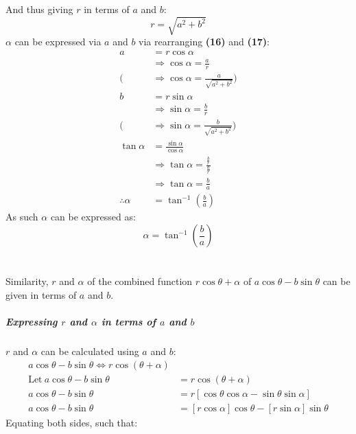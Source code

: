 \documentclass{article}
\begin{document}
        And thus giving $r$ in terms of $a$ and $b$:
        \begin{equation}
            r = \sqrt{a^2 + b^2}
        \end{equation}
        $\alpha$ can be expressed via $a$ and $b$ via rearranging \textbf{(16)} and \textbf{(17)}:
        \begin{align*}
            a &= r\cos\alpha \\
            &\Rightarrow \cos\alpha = \frac{a}{r} \\
            (&\Rightarrow \cos\alpha = \frac{a}{\sqrt{a^2 + b^2}}) \\
            b &= r\sin\alpha \\
            &\Rightarrow \sin\alpha = \frac{b}{r} \\
            (&\Rightarrow \sin\alpha = \frac{b}{\sqrt{a^2 + b^2}}) \\
            \tan\alpha &= \frac{\sin\alpha}{\cos\alpha} \\
            &\Rightarrow \tan\alpha = \frac{\frac{b}{r}}{\frac{a}{r}} \\
            &\Rightarrow \tan\alpha = \frac{b}{a} \\
            \therefore \alpha &= \tan^{-1}{\left( \frac{b}{a}\right) }
        \end{align*}
        As such $\alpha$ can be expressed as:
        \begin{equation}
            \alpha = \tan^{-1}{\left( \frac{b}{a}\right) }
        \end{equation} \\\\
        Similarity, $r$ and $\alpha$ of the combined function $r\cos{\theta + \alpha}$ of $a\cos{\theta} - b\sin{\theta}$ can be given in terms of $a$ and $b$.
        \subparagraph{Expressing $r$ and $\alpha$ in terms of $a$ and $b$} $r$ and $\alpha$ can be calculated using $a$ and $b$:
        \begin{align*}
        a\cos{\theta} - b\sin{\theta} \Leftrightarrow r\cos{(\theta + \alpha)} \\
        \mathrm{Let \ } a\cos{\theta} - b\sin{\theta} &= r\cos{(\theta + \alpha)} \\
        a\cos{\theta} - b\sin{\theta} &= r[\cos\theta\cos\alpha - \sin\theta\sin\alpha] \\
        a\cos{\theta} - b\sin{\theta} &= [r\cos\alpha]\cos{\theta} - [r\sin\alpha]\sin{\theta}
        \end{align*}
        Equating both sides, such that:
\end{document}
